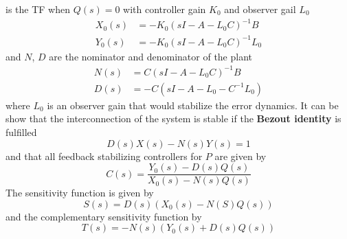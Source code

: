 is the TF when $Q(s)=0$ with controller gain $K_0$ and observer gail $L_0$
\noindent\begin{align*}
    X_0(s) & = -K_0{(sI-A-L_0C)}^{-1}B   \\
    Y_0(s) & = -K_0{(sI-A-L_0C)}^{-1}L_0
\end{align*}
and $N$, $D$ are the nominator and denominator of the plant
\begin{align*}
    N(s) & =C{(sI-A-L_0C)}^{-1}B    \\
    D(s) & = -C(sI-A-L_0-C^{-1}L_0)
\end{align*}
where $L_0$ is an observer gain that would stabilize the error dynamics.
\newpar{}
It can be show that the interconnection of the system is stable if the \textbf{Bezout identity} is fulfilled
\begin{equation*}
    D(s)X(s)-N(s)Y(s)=1
\end{equation*}
and that all feedback stabilizing controllers for $P$ are given by
\begin{equation*}
    C(s) = \frac{Y_0(s) -D(s)Q(s)}{X_0(s)-N(s)Q(s)}
\end{equation*}
The sensitivity function is given by
\begin{equation*}
    S(s) = D(s)(X_0(s)-N(S)Q(s))
\end{equation*}
and the complementary sensitivity function by
\begin{equation*}
    T(s) = -N(s)(Y_0(s)+D(s)Q(s))
\end{equation*}